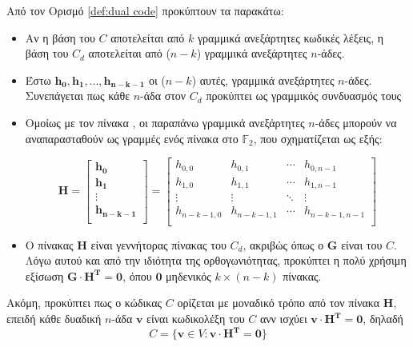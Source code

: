 Από τον Ορισμό \ref{def:dual code} προκύπτουν τα παρακάτω:

\begin{itemize}
\item Αν η βάση του $C$ αποτελείται από $k$ γραμμικά ανεξάρτητες κωδικές λέξεις, η βάση του $C_d$ αποτελείται από ($n-k$) γραμμικά ανεξάρτητες $n$-άδες.
\item Έστω $\mathbf{h_0, h_1, ..., h_{n-k-1}}$ οι ($n-k$) αυτές, γραμμικά ανεξάρτητες $n$-άδες. Συνεπάγεται πως κάθε $n$-άδα στον $C_d$ προκύπτει ως γραμμικός συνδυασμός τους
\item Ομοίως με τον πίνακα , οι παραπάνω γραμμικά ανεξάρτητες $n$-άδες μπορούν να αναπαρασταθούν ως γραμμές ενός πίνακα στο $\mathbb{F}_2$, που σχηματίζεται ως εξής:

\begin{equation}
\mathbf{H}=\begin{bmatrix}\mathbf{h_0}\\\mathbf{h_1}\\\vdots\\\mathbf{h_{n-k-1}}\\\end{bmatrix}=\begin{bmatrix}h_{0,0} & h_{0,1} & \cdots & h_{0,n-1}\\h_{1,0} & h_{1,1} & \cdots & h_{1,n-1}\\\vdots & \vdots & \ddots & \vdots\\h_{n-k-1,0} & h_{n-k-1,1} & \cdots & h_{n-k-1,n-1}\\\end{bmatrix}
\label{eq:parity check matrix}
\end{equation}
\item Ο πίνακας $\mathbf{H}$ είναι γεννήτορας πίνακας του $C_d$, ακριβώς όπως ο $\mathbf{G}$ είναι του $C$. Λόγω αυτού και από την ιδιότητα της ορθογωνιότητας, προκύπτει η πολύ χρήσιμη εξίσωση $\mathbf{G} \cdot \mathbf{H^T} = \mathbf{0}$, όπου $\mathbf{0}$ μηδενικός $k \times (n-k)$ πίνακας.
\end{itemize}

Ακόμη, προκύπτει πως ο κώδικας $C$ ορίζεται με μοναδικό τρόπο από τον πίνακα $\mathbf{H}$, επειδή κάθε δυαδική $n$-άδα $\mathbf{v}$ είναι κωδικολέξη του $C$ ανν
ισχύει $\mathbf{v} \cdot \mathbf{H^T} = \mathbf{0}$, δηλαδή
\begin{equation}
C=\lbrace\mathbf{v}\in V:\mathbf{v} \cdot \mathbf{H^T} = \mathbf{0}\rbrace
\label{eq:decoding equation}
\end{equation}

